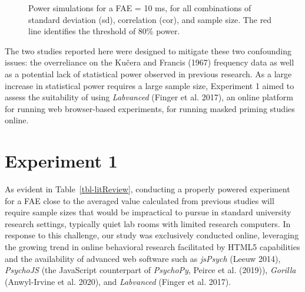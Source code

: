 \documentclass[
]{interact}
\begin{document}
\begin{figure}[H]


\caption{\label{fig-power}Power simulations for a FAE = 10 ms, for all
combinations of standard deviation (sd), correlation (cor), and sample
size. The red line identifies the threshold of 80\% power.}

\end{figure}%

The two studies reported here were designed to mitigate these two
confounding issues: the overreliance on the Kučera and Francis (1967)
frequency data as well as a potential lack of statistical power observed
in previous research. As a large increase in statistical power requires
a large sample size, Experiment 1 aimed to assess the suitability of
using \emph{Labvanced} (Finger et al. 2017), an online platform for
running web browser-based experiments, for running masked priming
studies online.

\section{Experiment 1}\label{sec-exp1}

As evident in Table~\ref{tbl-litReview}, conducting a properly powered
experiment for a FAE close to the averaged value calculated from
previous studies will require sample sizes that would be impractical to
pursue in standard university research settings, typically quiet lab
rooms with limited research computers. In response to this challenge,
our study was exclusively conducted online, leveraging the growing trend
in online behavioral research facilitated by HTML5 capabilities and the
availability of advanced web software such as \emph{jsPsych} (Leeuw
2014), \emph{PsychoJS} (the JavaScript counterpart of \emph{PsychoPy},
Peirce et al. (2019)), \emph{Gorilla} (Anwyl-Irvine et al. 2020), and
\emph{Labvanced} (Finger et al. 2017).
\end{document}
